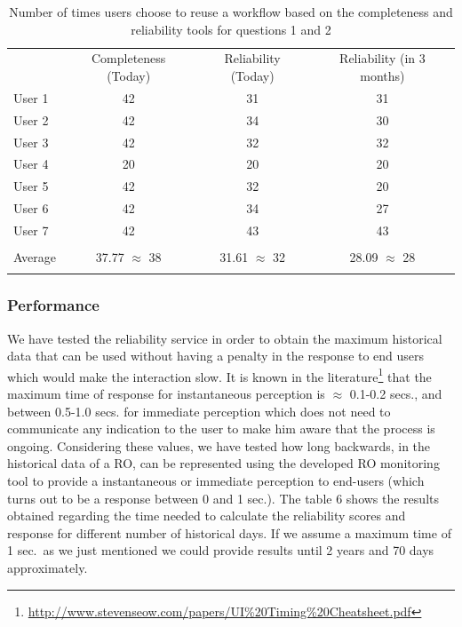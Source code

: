 \pagebreak [4]

\begin{longtable}[c]{@{}lccc@{}}
\hline\noalign{\medskip}
& Completeness (Today) & Reliability (Today) & Reliability (in 3 months)
\\\noalign{\medskip}
\hline\noalign{\medskip}
User 1 & 42 & 31 & 31
\\\noalign{\medskip}
User 2 & 42 & 34 & 30
\\\noalign{\medskip}
User 3 & 42 & 32 & 32
\\\noalign{\medskip}
User 4 & 20 & 20 & 20
\\\noalign{\medskip}
User 5 & 42 & 32 & 20
\\\noalign{\medskip}
User 6 & 42 & 34 & 27
\\\noalign{\medskip}
User 7 & 42 & 43 & 43
\\\noalign{\medskip}
\hline & & &
\\\noalign{\medskip}
Average & 37.77 $\approx$ 38 & 31.61 $\approx$ 32 & 28.09 $\approx$ 28
\\\noalign{\medskip}
\hline
\caption{Number of times users choose to reuse a workflow based on the
completeness and reliability tools for questions 1 and 2}
\end{longtable}

\subsubsection{Performance}

We have tested the reliability service in order to obtain the maximum
historical data that can be used without having a penalty in the
response to end users which would make the interaction slow. It is known
in the literature\footnote{\url{http://www.stevenseow.com/papers/UI\%20Timing\%20Cheatsheet.pdf}}
that the maximum time of response for instantaneous perception is
$\approx$ 0.1-0.2 secs., and between 0.5-1.0 secs. for immediate
perception which does not need to communicate any indication to the user
to make him aware that the process is ongoing. Considering these values,
we have tested how long backwards, in the historical data of a RO, can
be represented using the developed RO monitoring tool to provide a
instantaneous or immediate perception to end-users (which turns out to
be a response between 0 and 1 sec.). The table 6 shows the results
obtained regarding the time needed to calculate the reliability scores
and response for different number of historical days. If we assume a
maximum time of 1 sec.~as we just mentioned we could provide results
until 2 years and 70 days approximately.

